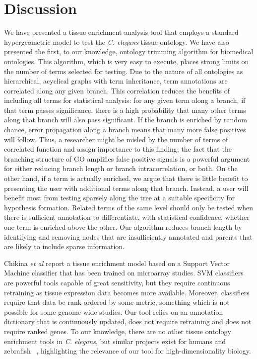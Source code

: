 \documentclass{bmcart}
\begin{document}
\section*{Discussion}
We have presented a tissue enrichment analysis tool that employs a standard hypergeometric model to test the   \emph{C. elegans} tissue ontology. We have also presented the first, to our knowledge, ontology trimming algorithm for biomedical ontologies. This algorithm, which is very easy to execute, places strong limits on the number of terms selected for testing. Due to the nature of all ontologies as hierarchical, acyclical graphs with term inheritance, term annotations are correlated along any given branch. This correlation reduces the benefits of including all terms for statistical analysis: for any given term along a branch, if that term passes significance, there is a high probability that many other terms along that branch will also pass significant. If the branch is enriched by random chance, error propagation along a branch means that many more false positives will follow. Thus, a researcher might be misled by the number of terms of correlated function and assign importance to this finding; the fact that the branching structure of GO amplifies false positive signals is a powerful argument for either reducing branch length or branch intracorrelation, or both. On the other hand, if a term is actually enriched, we argue that there is little benefit to presenting the user with additional terms along that branch. Instead, a user will benefit most from testing sparsely along the tree at a suitable specificity for hypothesis formation. Related terms of the same level should only be tested when there is sufficient annotation to differentiate, with statistical confidence, whether one term is enriched above the other. Our algorithm reduces branch length by identifying and removing nodes that are insufficiently annotated and parents that are likely to include sparse information.

Chikina \emph{et al}  \cite{Chikina2009} report a tissue enrichment model based on a Support Vector Machine classifier that has been trained on microarray studies. SVM classifiers are powerful tools capable of great sensitivity, but they require continuous retraining as tissue expression data becomes more available. Moreover, classifiers require that data be rank-ordered by some metric, something which is not possible for some genome-wide studies. Our tool relies on an annotation dictionary that is continuously updated, does not require retraining and does not require ranked genes. To our knowledge, there are no other tissue ontology enrichment tools in   \emph{C. elegans}, but similar projects exist for humans and zebrafish ~\cite{Lee2013, Prykhozhij2013}, highlighting the relevance of our tool for high-dimensionality biology.
\end{document}

